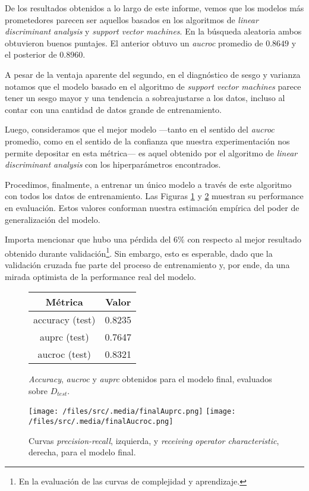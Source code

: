 De los resultados obtenidos a lo largo de este informe, vemos que los modelos más prometedores parecen ser aquellos basados en los algoritmos de \textit{linear discriminant analysis} y \textit{support vector machines}. En la búsqueda aleatoria ambos obtuvieron buenos puntajes. El anterior obtuvo un \textit{aucroc} promedio de $0.8649$ y el posterior de $0.8960$.

A pesar de la ventaja aparente del segundo, en el diagnóstico de sesgo y varianza notamos que el modelo basado en el algoritmo de \textit{support vector machines} parece tener un sesgo mayor y una tendencia a sobreajustarse a los datos, incluso al contar con una cantidad de datos grande de entrenamiento.

Luego, consideramos que el mejor modelo ---tanto en el sentido del \textit{aucroc} promedio, como en el sentido de la confianza que nuestra experimentación nos permite depositar en esta métrica--- es aquel obtenido por el algoritmo de \textit{linear discriminant analysis} con los hiperparámetros encontrados.  

Procedimos, finalmente, a entrenar un único modelo a través de este algoritmo con todos los datos de entrenamiento. Las Figuras \ref{metricas_final} y \ref{curvas_final} muestran su performance en evaluación. Estos valores conforman nuestra estimación empírica del poder de generalización del modelo.

Importa mencionar que hubo una pérdida del $6\%$ con respecto al mejor resultado obtenido durante validación\footnote{En la evaluación de las curvas de complejidad y aprendizaje.}. Sin embargo, esto es esperable, dado que la validación cruzada fue parte del proceso de entrenamiento y, por ende, da una mirada optimista de la performance real del modelo.

\vspace{0.5em}
\begin{figure}[!htbp]
    \begin{center}
        \begin{tabular}{ |c|c| } 
         \hline
        Métrica         & Valor \\
        \hline
        accuracy (test) &  0.8235 \\
        auprc (test)    &  0.7647 \\
        aucroc (test)   &  0.8321 \\
        \hline
        \end{tabular}
    \end{center}
    \caption{\textit{Accuracy}, \textit{aucroc} y \textit{auprc} obtenidos para el modelo final, evaluados sobre $D_{test}$.} \label{metricas_final}
\end{figure}

\begin{figure}[!htbp]
    \centering 
    \texttt{[image: /files/src/.media/finalAuprc.png]}
    \texttt{[image: /files/src/.media/finalAucroc.png]}
    \caption{Curvas \textit{precision-recall}, izquierda, y \textit{receiving operator characteristic}, derecha, para el modelo final.}
    \label{curvas_final}
\end{figure}
